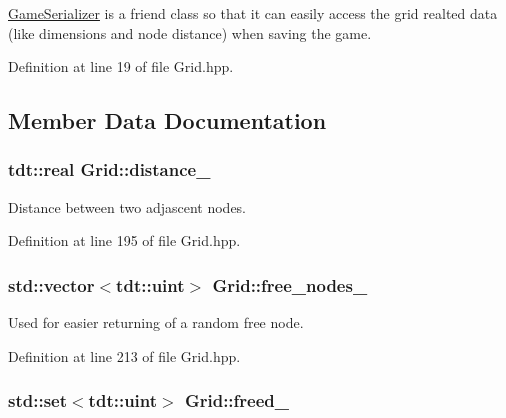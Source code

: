 \hyperlink{class_game_serializer}{Game\+Serializer} is a friend class so that it can easily access the grid realted data (like dimensions and node distance) when saving the game. 



Definition at line 19 of file Grid.\+hpp.



\subsection{Member Data Documentation}
\subsubsection[{\texorpdfstring{distance\+\_\+}{distance_}}]{\setlength{\rightskip}{0pt plus 5cm}tdt\+::real Grid\+::distance\+\_\+\hspace{0.3cm}{\ttfamily [private]}}\hypertarget{class_grid_aae31e3784132226a6ecc36c34065b342}{}\label{class_grid_aae31e3784132226a6ecc36c34065b342}


Distance between two adjascent nodes. 



Definition at line 195 of file Grid.\+hpp.

\subsubsection[{\texorpdfstring{free\+\_\+nodes\+\_\+}{free_nodes_}}]{\setlength{\rightskip}{0pt plus 5cm}std\+::vector$<$tdt\+::uint$>$ Grid\+::free\+\_\+nodes\+\_\+\hspace{0.3cm}{\ttfamily [private]}}\hypertarget{class_grid_aea5fa0d96189839d5d8cbceabcdba132}{}\label{class_grid_aea5fa0d96189839d5d8cbceabcdba132}


Used for easier returning of a random free node. 



Definition at line 213 of file Grid.\+hpp.

\subsubsection[{\texorpdfstring{freed\+\_\+}{freed_}}]{\setlength{\rightskip}{0pt plus 5cm}std\+::set$<$tdt\+::uint$>$ Grid\+::freed\+\_\+\hspace{0.3cm}{\ttfamily [private]}}\hypertarget{class_grid_a7a4fbc012ddbfcc4330b8042f83e79cb}{}\label{class_grid_a7a4fbc012ddbfcc4330b8042f83e79cb}


